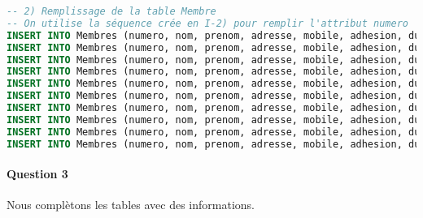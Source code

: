 \documentclass[10pt, oneside]{article}
\begin{document}
\begin{lstlisting}[language=sql, title=Question 2, label=QII2]
-- 2) Remplissage de la table Membre
-- On utilise la séquence crée en I-2) pour remplir l'attribut numero
INSERT INTO Membres (numero, nom, prenom, adresse, mobile, adhesion, duree) VALUES (seq_membre.nextval, 'ALBERT', 'Anne', '13 rue des alpes', '0601020304', SYSDATE-60, 1);
INSERT INTO Membres (numero, nom, prenom, adresse, mobile, adhesion, duree) VALUES (seq_membre.nextval, 'BERNAUD', 'Barnabe', '6 rue des becasses', '0602030105', SYSDATE-10, 3);
INSERT INTO Membres (numero, nom, prenom, adresse, mobile, adhesion, duree) VALUES (seq_membre.nextval, 'CUVARD', 'Camille', '52 rue des cerisiers', '0602010509', SYSDATE-100, 6);
INSERT INTO Membres (numero, nom, prenom, adresse, mobile, adhesion, duree) VALUES (seq_membre.nextval, 'DUPOND', 'Daniel', '11 rue des daims', '0610236515', SYSDATE-250, 12);
INSERT INTO Membres (numero, nom, prenom, adresse, mobile, adhesion, duree) VALUES (seq_membre.nextval, 'EVROUX', 'Eglantine', '34 rue des elfes', '0658963125', SYSDATE-150, 6);
INSERT INTO Membres (numero, nom, prenom, adresse, mobile, adhesion, duree) VALUES (seq_membre.nextval, 'FREGEON', 'Fernand', '11 rue des Francs', '0602036987', SYSDATE-400, 6);
INSERT INTO Membres (numero, nom, prenom, adresse, mobile, adhesion, duree) VALUES (seq_membre.nextval, 'GORIT', 'Gaston', '96 rue de la glacerie', '0684235781', SYSDATE-150, 1);
INSERT INTO Membres (numero, nom, prenom, adresse, mobile, adhesion, duree) VALUES (seq_membre.nextval, 'HEVARD', 'Hector', '12 rue haute', '0608546578', SYSDATE-250, 12);
INSERT INTO Membres (numero, nom, prenom, adresse, mobile, adhesion, duree) VALUES (seq_membre.nextval, 'INGRAND', 'Irene', '54 rue des iris', '0605020409', SYSDATE-50, 12);
INSERT INTO Membres (numero, nom, prenom, adresse, mobile, adhesion, duree) VALUES (seq_membre.nextval, 'JUSTE', 'Julien', '5 place des Jacobins', '0603069876', SYSDATE-100, 6);
\end{lstlisting}


\paragraph{Question 3} Nous complètons les tables avec des informations.
\end{document}

